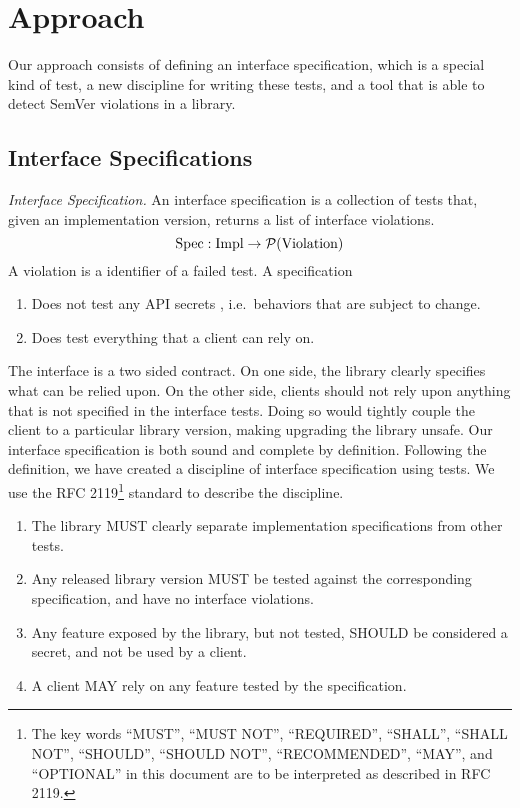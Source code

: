 \section{Approach}

Our approach consists of defining an interface specification, which is a
special kind of test, a new discipline for writing these tests, and a tool
that is able to detect SemVer violations in a library.

\subsection{Interface Specifications}

\begin{definition}\textit{Interface Specification.}
An interface specification is a collection of tests that, given an
implementation version, returns a list of interface violations. 
$$\text{Spec} : \text{Impl} \to \mathcal{P}(\text{Violation})$$
A violation is a identifier of a failed test. A specification
\begin{enumerate}
\item Does not test any API secrets \cite{Parnas}, i.e.\ behaviors
  that are subject to change.
    \item Does test everything that a client can rely on.  
\end{enumerate}
\end{definition}

The interface is a two sided contract. On one side, the library
clearly specifies what can be relied upon. On the other side, clients
should not rely upon anything that is not specified in the interface
tests.  Doing so would tightly couple the client to a particular
library version, making upgrading the library unsafe. Our interface
specification is both sound and complete by definition.  Following the
definition, we have created a discipline of interface specification
using tests. We use the RFC 2119\footnote{The key words ``MUST'',
  ``MUST NOT'', ``REQUIRED'', ``SHALL'', ``SHALL NOT'', ``SHOULD'',
  ``SHOULD NOT'', ``RECOMMENDED'', ``MAY'', and ``OPTIONAL'' in this
  document are to be interpreted as described in RFC
  2119\cite{rfc2119}.} standard to describe the discipline.

\begin{enumerate}
    \item The library MUST clearly separate implementation specifications from
    other tests.
    \item Any released library version MUST be tested against the corresponding
    specification, and have no interface violations.
    \item Any feature exposed by the library, but not tested, SHOULD be
    considered a secret, and not be used by a client.
    \item A client MAY rely on any feature tested by the specification.
\end{enumerate}

